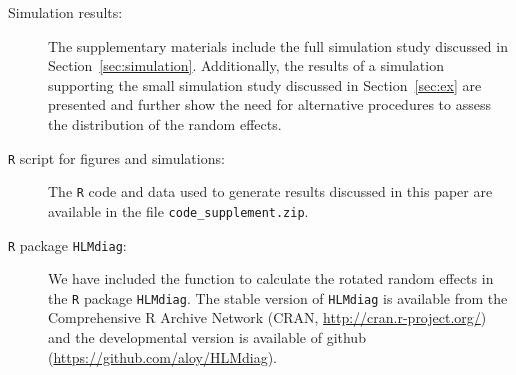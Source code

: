 \documentclass[12pt]{article} %
\newcommand{\al}[1]{{\color{red} #1}}
\begin{document}
\begin{description}
\item[Simulation results:] The supplementary materials include the full simulation study discussed in Section~\ref{sec:simulation}. Additionally, the results of a simulation supporting the small simulation study discussed in Section~\ref{sec:ex} are presented and further show the need for alternative procedures to assess the distribution of the random effects.

\item[\texttt{R} script for figures and simulations:] The \texttt{R} code and data used to generate results discussed in this paper are available in the file \texttt{code\_supplement.zip}. 

\item[\texttt{R} package \texttt{HLMdiag}:] We have included the function to calculate the rotated random effects in the \texttt{R} package \texttt{HLMdiag}. \al{ The stable version of \texttt{HLMdiag} is available from the Comprehensive R Archive Network (CRAN, \url{http://cran.r-project.org/}) and the developmental version is available of github (\url{https://github.com/aloy/HLMdiag}).}
\end{description}



\end{document}
